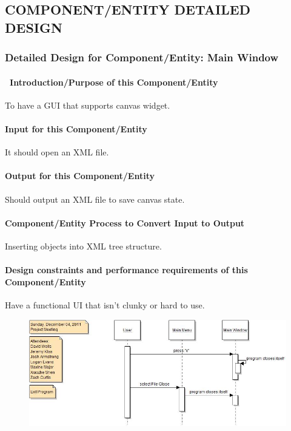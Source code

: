 \documentclass[twoside,letterpaper]{article}
\begin{document}
{\subsection[COMPONENT/ENTITY DETAILED
DESIGN]{\bfseries\color{black} COMPONENT/ENTITY
DETAILED DESIGN}

\subsubsection{Detailed Design for Component/Entity: Main Window}

\paragraph[\ Introduction/Purpose of this
Component/Entity]{\ Introduction/Purpose of this Component/Entity}
{\color{black}
To have a GUI that supports canvas widget.
}

\paragraph[Input for this Component/Entity]{Input for this
Component/Entity}
{\color{black}
It should open an XML file.
}

\paragraph{Output for this Component/Entity}
{\color{black}
Should output an XML file to save canvas state.
}

\paragraph{Component/Entity Process to Convert Input to Output}
{\color{black}
Inserting objects into XML tree structure.
}

\paragraph{Design constraints and performance requirements of this
Component/Entity}
{\color{black}
Have a functional UI that isn't clunky or hard to use.
}

\begin{figure}
\centering
\includegraphics[width=5.0in]{2011-12-04_IntExit.jpg}
\end{figure}

}
\end{document}
